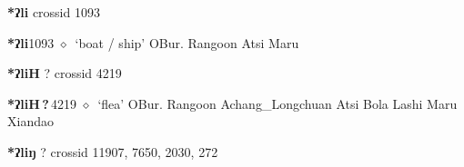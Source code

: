 \item
\textbf{*ʔli}
  {\tiny crossid 1093}
  \begin{list}{}{\leftmargin=1.5em \itemindent=-1.5em}
  \item {\footnotesize \textbf{*ʔli}}{\tiny 1093}
         $\diamond$~`boat / ship'
         OBur. 
\hspace{1ex}
         Rangoon 
\hspace{1ex}
         Atsi 
\hspace{1ex}
         Maru 
  \end{list}
\item
\textbf{*ʔliH}
?
  {\tiny crossid 4219}
  \begin{list}{}{\leftmargin=1.5em \itemindent=-1.5em}
  \item {\footnotesize \textbf{*ʔliH\,?\,}}{\tiny 4219}
         $\diamond$~`flea'
         OBur. 
\hspace{1ex}
         Rangoon 
\hspace{1ex}
         Achang\_Longchuan 
\hspace{1ex}
         Atsi 
\hspace{1ex}
         Bola 
\hspace{1ex}
         Lashi 
\hspace{1ex}
         Maru 
\hspace{1ex}
         Xiandao 
  \end{list}
\item
\textbf{*ʔliŋ}
?
  {\tiny crossid 11907, 7650, 2030, 272}
